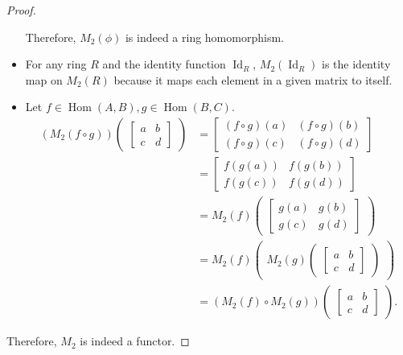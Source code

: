 \documentclass[12pt, psamsfonts]{amsart}
\theoremstyle{definition}
\theoremstyle{remark}
\DeclareMathOperator{\Hom}{Hom}
\DeclareMathOperator{\Id}{Id}
\numberwithin{equation}{section}
\begin{document}
\begin{proof}
\begin{itemize}
     Therefore, $M_2(\phi)$ is indeed a ring homomorphism.
   \item
     For any ring $R$ and the identity function $\Id_R$, $M_2(\Id_R)$ is the identity map on $M_2(R)$ because it maps each element in a given matrix to itself.
   \item
     Let $f \in \Hom(A, B), g \in \Hom(B, C)$.
     \begin{align*}
       (M_2(f \circ g))\begin{pmatrix}\begin{bmatrix} a & b \\ c & d \end{bmatrix}\end{pmatrix}
        &= \begin{bmatrix} (f \circ g)(a) & (f \circ g)(b) \\ (f \circ g)(c) & (f \circ g)(d) \end{bmatrix} \\
        &= \begin{bmatrix} f(g(a)) & f(g(b)) \\ f(g(c)) & f(g(d)) \end{bmatrix} \\
        &= M_2(f)\begin{pmatrix}\begin{bmatrix} g(a) & g(b) \\ g(c) & g(d) \end{bmatrix}\end{pmatrix}\\
        &= M_2(f)\begin{pmatrix}M_2(g)\begin{pmatrix}\begin{bmatrix} a & b \\ c & d \end{bmatrix}\end{pmatrix}\end{pmatrix} \\
        &= (M_2(f) \circ M_2(g))\begin{pmatrix}\begin{bmatrix} a & b \\ c & d \end{bmatrix}\end{pmatrix}.
     \end{align*}
 \end{itemize}
 Therefore, $M_2$ is indeed a functor.
\end{proof}
\end{document}
